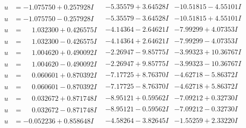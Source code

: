\documentclass[1p]{elsarticle_modified}
\theoremstyle{definition}
\begin{document}
$$\begin{array}{c|c|c}
\begin{aligned}
u &= -1.075750 + 0.257928 I\end{aligned}
 & -5.35579 + 3.64528 I & -10.51815 - 4.55101 I \\ \hline\begin{aligned}
u &= -1.075750 - 0.257928 I\end{aligned}
 & -5.35579 - 3.64528 I & -10.51815 + 4.55101 I \\ \hline\begin{aligned}
u &= \phantom{-}1.032300 + 0.426575 I\end{aligned}
 & -4.14364 - 2.64621 I & -7.99299 + 4.07353 I \\ \hline\begin{aligned}
u &= \phantom{-}1.032300 - 0.426575 I\end{aligned}
 & -4.14364 + 2.64621 I & -7.99299 - 4.07353 I \\ \hline\begin{aligned}
u &= \phantom{-}1.004620 + 0.490092 I\end{aligned}
 & -2.26947 - 9.85775 I & -3.99323 + 10.36767 I \\ \hline\begin{aligned}
u &= \phantom{-}1.004620 - 0.490092 I\end{aligned}
 & -2.26947 + 9.85775 I & -3.99323 - 10.36767 I \\ \hline\begin{aligned}
u &= \phantom{-}0.060601 + 0.870392 I\end{aligned}
 & -7.17725 + 8.76370 I & -4.62718 - 5.86372 I \\ \hline\begin{aligned}
u &= \phantom{-}0.060601 - 0.870392 I\end{aligned}
 & -7.17725 - 8.76370 I & -4.62718 + 5.86372 I \\ \hline\begin{aligned}
u &= \phantom{-}0.032672 + 0.871748 I\end{aligned}
 & -8.95121 + 0.59562 I & -7.09212 + 0.32730 I \\ \hline\begin{aligned}
u &= \phantom{-}0.032672 - 0.871748 I\end{aligned}
 & -8.95121 - 0.59562 I & -7.09212 - 0.32730 I \\ \hline\begin{aligned}
u &= -0.052236 + 0.858648 I\end{aligned}
 & -4.58264 - 3.82645 I & -1.55259 + 2.33220 I \\ \hline\begin{aligned}

\end{aligned}
\end{array}$$
\end{document}
